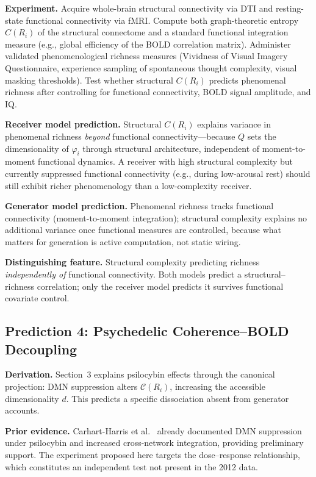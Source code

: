 \documentclass[12pt]{article}
\begin{document}
\textbf{Experiment.} Acquire whole-brain structural connectivity via DTI and resting-state functional connectivity via fMRI. Compute both graph-theoretic entropy $C(R_i)$ of the structural connectome and a standard functional integration measure (e.g., global efficiency of the BOLD correlation matrix). Administer validated phenomenological richness measures (Vividness of Visual Imagery Questionnaire, experience sampling of spontaneous thought complexity, visual masking thresholds). Test whether structural $C(R_i)$ predicts phenomenal richness after controlling for functional connectivity, BOLD signal amplitude, and IQ.

\textbf{Receiver model prediction.} Structural $C(R_i)$ explains variance in phenomenal richness \textit{beyond} functional connectivity---because $Q$ sets the dimensionality of $\varphi_i$ through structural architecture, independent of moment-to-moment functional dynamics. A receiver with high structural complexity but currently suppressed functional connectivity (e.g., during low-arousal rest) should still exhibit richer phenomenology than a low-complexity receiver.

\textbf{Generator model prediction.} Phenomenal richness tracks functional connectivity (moment-to-moment integration); structural complexity explains no additional variance once functional measures are controlled, because what matters for generation is active computation, not static wiring.

\textbf{Distinguishing feature.} Structural complexity predicting richness \textit{independently of} functional connectivity. Both models predict a structural--richness correlation; only the receiver model predicts it survives functional covariate control.

\subsection{Prediction 4: Psychedelic Coherence--BOLD Decoupling}

\textbf{Derivation.} Section~3 explains psilocybin effects through the canonical projection: DMN suppression alters $\mathcal{C}(R_i)$, increasing the accessible dimensionality $d$. This predicts a specific dissociation absent from generator accounts.

\textbf{Prior evidence.} Carhart-Harris et al.\ \cite{carhart-harris2012} already documented DMN suppression under psilocybin and increased cross-network integration, providing preliminary support. The experiment proposed here targets the dose--response relationship, which constitutes an independent test not present in the 2012 data.
\end{document}
